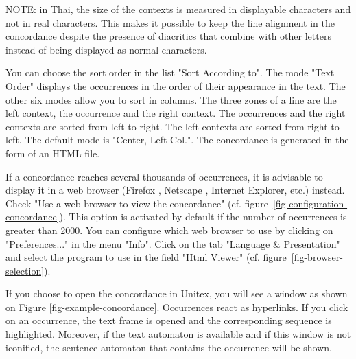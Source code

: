 \bigskip
\noindent NOTE: in Thai, the size of the contexts is measured in displayable
characters and not in real characters. This makes it possible to keep the line alignment in
the concordance despite the presence of diacritics that combine with other
letters instead of being displayed as normal characters.

\bigskip
\noindent You can choose the sort order in the list "Sort According to". The
mode "Text Order" displays the occurrences in the order of their appearance in the text. The other six
modes allow you to sort in columns. The three zones of a line are the left
context, the occurrence and the right context. The occurrences and the right
contexts are sorted from left to right. The left contexts are sorted from right
to left. The default mode is "Center, Left Col.". The concordance is generated
in the form of an HTML file.

\bigskip
\noindent If a concordance reaches several thousands of occurrences, it is advisable to
display it  in a web browser (Firefox \cite{Firefox}, Netscape \cite{Netscape},
Internet Explorer, etc.) instead. Check "Use a web
browser to view the concordance" (cf. figure~\ref{fig-configuration-concordance}). 
This option is activated by default if the number of occurrences is greater than 2000.
You can configure which web browser to use by clicking on "Preferences..." in
the menu "Info". Click on the tab "Language \& Presentation" and
select the program to use in the field "Html Viewer" 
(cf. figure~\ref{fig-browser-selection}).

\bigskip
\noindent {} If you choose to open the concordance in
Unitex, you will see a window as shown on Figure \ref{fig-example-concordance}. 
Occurrences react as hyperlinks. If you click on an occurrence, the text frame is
opened and the corresponding sequence is highlighted. Moreover, if the text automaton is
available and if this window is not iconified, the sentence automaton that
contains the occurrence will be shown. 

